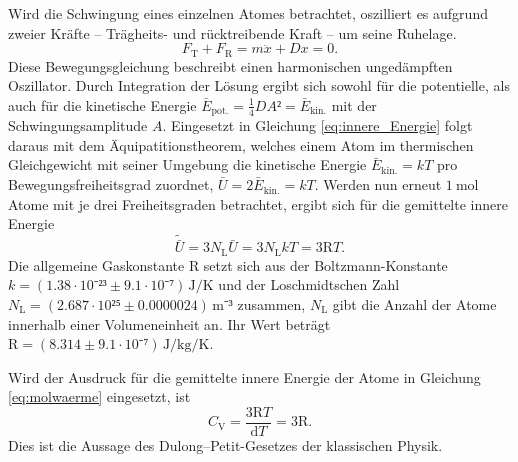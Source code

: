 Wird die Schwingung eines einzelnen Atomes betrachtet, oszilliert es aufgrund zweier Kräfte -- Trägheits- und rücktreibende Kraft -- um seine Ruhelage. 
\begin{equation}
	F_\mathup{T}+F_\mathup{R}=m\ddot{x}+Dx=0.
\end{equation}
Diese Bewegungsgleichung beschreibt einen harmonischen ungedämpften Oszillator. 
Durch Integration der Lösung ergibt sich sowohl für die potentielle, als auch für die kinetische Energie $\bar{E}_\mathup{pot.}=\frac{1}{4}DA²=\bar{E}_\mathup{kin.}$ mit der Schwingungsamplitude $A$.
Eingesetzt in Gleichung \eqref{eq:innere_Energie}
folgt daraus mit dem Äquipatitionstheorem, welches einem Atom im thermischen Gleichgewicht mit seiner Umgebung die kinetische Energie $\bar{E}_\mathup{kin.}=kT$ pro Bewegungsfreiheitsgrad zuordnet, $\bar{U}=2\bar{E}_\mathup{kin.}=kT$. 
Werden nun erneut $\SI{1}{\mol}$ Atome mit je drei Freiheitsgraden betrachtet, ergibt sich für die gemittelte innere Energie 
\begin{equation}
	\tilde{\bar{U}}=3N_\mathup{L}\bar{U}=3N_\mathup{L}kT=3\text{R}T.
\end{equation}
Die allgemeine Gaskonstante $\text{R}$\cite{Gaskonstante} setzt sich aus der Boltzmann-Konstante $k=(1.38\cdot{10⁻²³}\pm9.1\cdot{10⁻⁷})\,\si{\joule\per\kelvin}$\cite{Boltzmannkonstante} und 
der Loschmidtschen Zahl $N_\mathup{L}=(2.687\cdot 10²⁵\pm0.0000024)\,\si{\meter}⁻³$\cite{Loschmidtzahl} zusammen,
$N_\mathup{L}$ gibt die Anzahl der Atome innerhalb einer Volumeneinheit an. 
Ihr Wert beträgt $\text{R}=(8.314\pm9.1\cdot{10⁻⁷})\,\si{\joule\per\kilo\gram\per\kelvin}$.

Wird der Ausdruck für die gemittelte innere Energie der Atome in Gleichung \eqref{eq:molwaerme} eingesetzt, ist
\begin{equation}
	C_\mathup{V}=\frac{3\text{R}T}{\mathup{d}T}=3\text{R}.
\label{eq:dulong-petit}
\end{equation}
Dies ist die Aussage des Dulong--Petit-Gesetzes der klassischen Physik.\\

